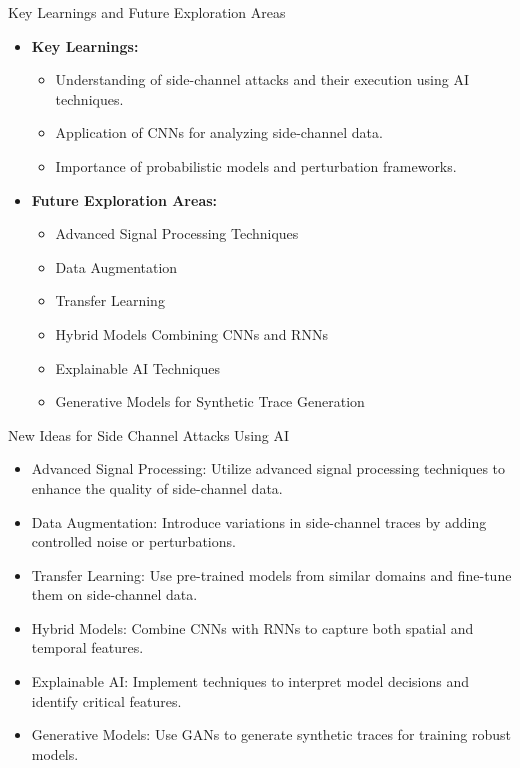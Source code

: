 \documentclass{beamer}
\begin{document}
\begin{frame}{Key Learnings and Future Exploration Areas}
    \begin{itemize}
        \item \textbf{Key Learnings:}
        \begin{itemize}
            \item Understanding of side-channel attacks and their execution using AI techniques.
            \item Application of CNNs for analyzing side-channel data.
            \item Importance of probabilistic models and perturbation frameworks.
        \end{itemize}
        \item \textbf{Future Exploration Areas:}
        \begin{itemize}
            \item Advanced Signal Processing Techniques
            \item Data Augmentation
            \item Transfer Learning
            \item Hybrid Models Combining CNNs and RNNs
            \item Explainable AI Techniques
            \item Generative Models for Synthetic Trace Generation
        \end{itemize}
    \end{itemize}
\end{frame}

\begin{frame}{New Ideas for Side Channel Attacks Using AI}
    \begin{itemize}
        \item Advanced Signal Processing: Utilize advanced signal processing techniques to enhance the quality of side-channel data.
        \item Data Augmentation: Introduce variations in side-channel traces by adding controlled noise or perturbations.
        \item Transfer Learning: Use pre-trained models from similar domains and fine-tune them on side-channel data.
        \item Hybrid Models: Combine CNNs with RNNs to capture both spatial and temporal features.
        \item Explainable AI: Implement techniques to interpret model decisions and identify critical features.
        \item Generative Models: Use GANs to generate synthetic traces for training robust models.
    \end{itemize}
\end{frame}
\end{document}
